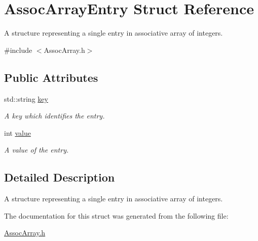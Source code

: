 \hypertarget{struct_assoc_array_entry}{\section{Assoc\-Array\-Entry Struct Reference}
\label{struct_assoc_array_entry}
}


A structure representing a single entry in associative array of integers.  




{\ttfamily \#include $<$Assoc\-Array.\-h$>$}

\subsection*{Public Attributes}
\begin{DoxyCompactItemize}
\item 
\hypertarget{struct_assoc_array_entry_a38b42fb8a747f73a055e062b5038824f}{std\-::string \hyperlink{struct_assoc_array_entry_a38b42fb8a747f73a055e062b5038824f}{key}}\label{struct_assoc_array_entry_a38b42fb8a747f73a055e062b5038824f}

\begin{DoxyCompactList}\small\item\em A key which identifies the entry. \end{DoxyCompactList}\item 
\hypertarget{struct_assoc_array_entry_a03e4bbf38f6c0879aa2ad9c7b9da17c2}{int \hyperlink{struct_assoc_array_entry_a03e4bbf38f6c0879aa2ad9c7b9da17c2}{value}}\label{struct_assoc_array_entry_a03e4bbf38f6c0879aa2ad9c7b9da17c2}

\begin{DoxyCompactList}\small\item\em A value of the entry. \end{DoxyCompactList}\end{DoxyCompactItemize}


\subsection{Detailed Description}
A structure representing a single entry in associative array of integers. 

The documentation for this struct was generated from the following file\-:\begin{DoxyCompactItemize}
\item 
\hyperlink{_assoc_array_8h}{Assoc\-Array.\-h}\end{DoxyCompactItemize}
